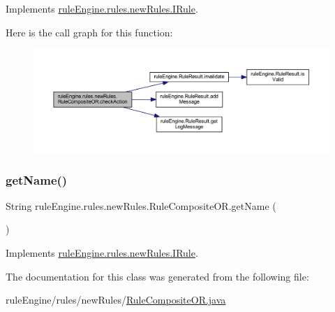 Implements \mbox{\hyperlink{interfacerule_engine_1_1rules_1_1new_rules_1_1_i_rule_a72ce29a47d7a5fba75a09444a50a481e}{rule\+Engine.\+rules.\+new\+Rules.\+I\+Rule}}.

Here is the call graph for this function\+:
\nopagebreak
\begin{figure}[H]
\begin{center}
\leavevmode
\includegraphics[width=350pt]{classrule_engine_1_1rules_1_1new_rules_1_1_rule_composite_o_r_ae6975e9b9943319bcaa0608bfdc56207_cgraph}
\end{center}
\end{figure}
\mbox{\label{classrule_engine_1_1rules_1_1new_rules_1_1_rule_composite_o_r_a5188ec90f3d18b5fc6f2f7eea8ece5c6}} 
\subsubsection{\texorpdfstring{get\+Name()}{getName()}}
{\footnotesize\ttfamily String rule\+Engine.\+rules.\+new\+Rules.\+Rule\+Composite\+O\+R.\+get\+Name (\begin{DoxyParamCaption}{ }\end{DoxyParamCaption})\hspace{0.3cm}{\ttfamily [inline]}}



Implements \mbox{\hyperlink{interfacerule_engine_1_1rules_1_1new_rules_1_1_i_rule_a99e11d165ca863908c6e985a79917067}{rule\+Engine.\+rules.\+new\+Rules.\+I\+Rule}}.



The documentation for this class was generated from the following file\+:\begin{DoxyCompactItemize}
\item 
rule\+Engine/rules/new\+Rules/\mbox{\hyperlink{_rule_composite_o_r_8java}{Rule\+Composite\+O\+R.\+java}}\end{DoxyCompactItemize}
